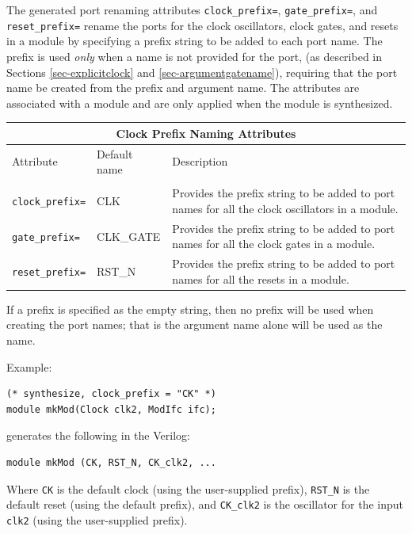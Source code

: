 \documentclass[twoside,letterpaper]{article}
\newcommand{\te}[1]{\texttt{#1}}
\begin{document}
The generated port renaming attributes \te{clock\_prefix=},
\te{gate\_prefix=}, and \te{reset\_prefix=} rename  the
 ports for the clock oscillators, clock gates, and resets in a module by
specifying a prefix string to be added to each port name.
 The prefix is used \emph{only} when a  name is not provided for the port,
(as described in Sections \ref{sec-explicitclock} and \ref{sec-argumentgatename}),
requiring that  the
port name be created from the prefix and argument name.
The attributes are
associated with a module and are only applied when the module is synthesized.


\begin{center}
\begin{tabular}{|p{1.2 in}|p{1 in}|p{3.4 in}|}
\hline
\multicolumn{3}{|c|}{Clock Prefix Naming Attributes}\\
\hline
Attribute&Default name&Description\\
&&\\
\hline
\hline
\te{clock\_prefix=}& CLK& Provides the prefix string to be added to
port names for all the clock oscillators in a module.\\
\hline
\te{gate\_prefix=}& CLK\_GATE& Provides the prefix string to be added to
port names for all the clock gates in a module.\\
\hline
\te{reset\_prefix=}&RST\_N & Provides the prefix string to be added to
port names for all the resets in a module.\\
\hline
\end{tabular}
\end{center}



If a prefix is specified as the empty string, then no prefix will be
used when creating the port names; that is the argument name alone
will be used as the name. 

Example:
\begin{verbatim}
(* synthesize, clock_prefix = "CK" *)
module mkMod(Clock clk2, ModIfc ifc);
\end{verbatim}
generates the following in the  Verilog:
\begin{verbatim}
module mkMod (CK, RST_N, CK_clk2, ...
\end{verbatim}
Where \te{CK} is the default clock (using the user-supplied prefix),
 \te{RST\_N} is the default reset (using the default prefix), and
 \te{CK\_clk2} is the oscillator for the input \te{clk2} (using the
    user-supplied prefix).
\end{document}

